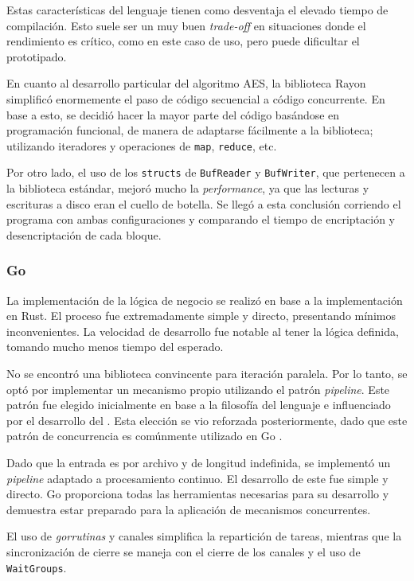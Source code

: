 \documentclass[11pt]{article}
\let\Oldsubsubsection\subsubsection
\renewcommand{\subsubsection}{\FloatBarrier\Oldsubsubsection}
\newcommand{\english}[1]{\textit{#1}}
\begin{document}
Estas características del lenguaje tienen como desventaja el elevado tiempo de compilación. Esto suele ser un muy buen \english{trade-off} en situaciones donde el rendimiento es crítico, como en este caso de uso, pero puede dificultar el prototipado.

En cuanto al desarrollo particular del algoritmo AES, la biblioteca Rayon simplificó enormemente el paso de código secuencial a código concurrente. En base a esto, se decidió hacer la mayor parte del código basándose en programación funcional, de manera de adaptarse fácilmente a la biblioteca; utilizando iteradores y operaciones de \lstinline{map}, \lstinline{reduce}, etc.

Por otro lado, el uso de los \lstinline{structs} de \lstinline{BufReader} y \lstinline{BufWriter}, que pertenecen a la biblioteca estándar, mejoró mucho la \english{performance}, ya que las lecturas y escrituras a disco eran el cuello de botella. Se llegó a esta conclusión corriendo el programa con ambas configuraciones y comparando el tiempo de encriptación y desencriptación de cada bloque.

\subsubsection{Go}


La implementación de la lógica de negocio se realizó en base a la implementación en Rust. El proceso fue extremadamente simple y directo, presentando mínimos inconvenientes. La velocidad de desarrollo fue notable al tener la lógica definida, tomando mucho menos tiempo del esperado.

No se encontró una biblioteca convincente para iteración paralela. Por lo tanto, se optó por implementar un mecanismo propio utilizando el patrón \textit{pipeline}. Este patrón fue elegido inicialmente en base a la filosofía del lenguaje \cite{go:ex:sharing} e influenciado por el desarrollo del . Esta elección se vio reforzada posteriormente, dado que este patrón de concurrencia es comúnmente utilizado en Go \cite{go:ex:pipelines}.

Dado que la entrada es por archivo y de longitud indefinida, se implementó un \textit{pipeline} adaptado a procesamiento continuo. El desarrollo de este fue simple y directo. Go proporciona todas las herramientas necesarias para su desarrollo y demuestra estar preparado para la aplicación de mecanismos concurrentes.

El uso de \textit{gorrutinas} y canales simplifica la repartición de tareas, mientras que la sincronización de cierre se maneja con el cierre de los canales y el uso de \lstinline{WaitGroups}.
\end{document}

